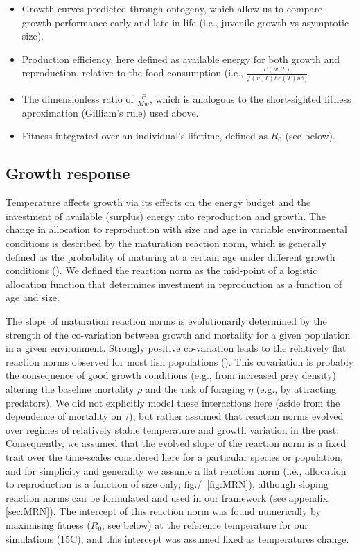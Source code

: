 \documentclass[11pt]{article}\usepackage[]{graphicx}\usepackage[]{color}
\begin{document}
\begin{itemize}

\item Growth curves predicted through ontogeny, which allow us to compare growth performance early and late in life (i.e., juvenile growth vs asymptotic size).
\item Production efficiency, here defined as available energy for both growth and reproduction, relative to the food consumption (i.e., $\frac{P(w,T)}{f(w,T)h c(T) w^q)}$.
\item The dimensionless ratio of $\frac{P}{Mw}$, which is analogous to the short-sighted fitness aproximation (Gilliam's rule) used above.
\item Fitness integrated over an individual's lifetime, defined as $R_0$ (see below).

\end{itemize}

\subsection*{Growth response}

Temperature affects growth via its effects on the energy budget and the investment of available (surplus) energy into reproduction and growth. The change in allocation to reproduction with size and age in variable environmental conditions is described by the maturation reaction norm, which is generally defined as the probability of maturing at a certain age under different growth conditions (\cite[e.g., ][]{dieckmann_probabilistic_2007}). We defined the reaction norm as the mid-point of a logistic allocation function that determines investment in reproduction as a function of age and size. 

The slope of maturation reaction norms is evolutionarily determined by the strength of the co-variation between growth and mortality for a given population in a given environment. Strongly positive co-variation leads to the relatively flat reaction norms observed for most fish populations (\cite{marty_impact_2011}). This covariation is probably the consequence of good growth conditions (e.g., from increased prey density) altering the baseline mortality $\rho$ and the risk of foraging $\eta$ (e.g., by attracting predators). We did not explicitly model these interactions here (aside from the dependence of mortality on $\tau$), but rather assumed that reaction norms evolved over regimes of relatively stable temperature and growth variation in the past. Consequently, we assumed that the evolved slope of the reaction norm is a fixed trait over the time-scales considered here for a particular species or population, and for simplicity and generality we assume a flat reaction norm (i.e., allocation to reproduction is a function of size only; fig./~\ref{fig:MRN}), although sloping reaction norms can be formulated and used in our framework (see appendix \ref{sec:MRN}). The intercept of this reaction norm was found numerically by maximising fitness ($R_0$, see below) at the reference temperature for our simulations (15\degree C), and this intercept was assumed fixed as temperatures change.
\end{document}
